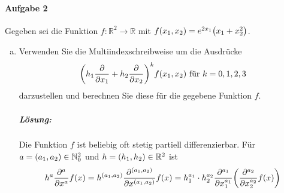 \documentclass{scrreprt}
\begin{document}
\paragraph{Aufgabe 2} Gegeben sei die Funktion
$f \colon \mathbb{R}^2 \to \mathbb{R}$ mit
$f\qty(x_1, x_2) = e^{2x_1}\qty(x_1 + x_2^2)$.
\begin{enumerate}[a)]
\item Verwenden Sie die Multiindexschreibweise um die Ausdrücke
  \[
    \qty(h_1\frac{\partial}{\partial x_1} + h_2 \frac{\partial}{\partial x_2})^k f\qty(x_1, x_2) \text{ für } k = 0,1,2,3
  \]
  darzustellen und berechnen Sie diese für die gegebene Funktion $f$.

  \subparagraph{Lösung:} Die Funktion $f$ ist beliebig oft stetig partiell
  differenzierbar.
  Für $a = \qty(a_1, a_2) \in \mathbb{N}_0^2$ und $h = \qty(h_1, h_2) \in \mathbb{R}^2$ ist
  \[
    h^a \frac{\partial^a}{\partial x^a}f(x)
    = h^{\qty(a_1, a_2)} \frac{\partial^{\qty(a_1, a_2)}}{\partial x^{\qty(a_1, a_2)}}f(x)
    = h_1^{a_1} \cdot h_2^{a_2} \frac{\partial^{a_1}}{\partial x_1^{a_1}} \qty(\frac{\partial^{a_2}}{\partial x_2^{a_2}} f(x))
  \]
  \newpage
\end{enumerate}
\end{document}
